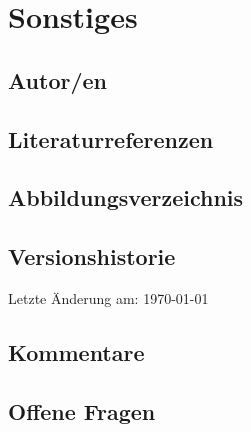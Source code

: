
\section*{Sonstiges}

\subsection*{Autor/en}
\authors

\subsection*{Literaturreferenzen}
\literature

\subsection*{Abbildungsverzeichnis}
\figures

\subsection*{Versionshistorie}
Letzte Änderung am: {\today} \\
\versionhistory

\subsection*{Kommentare}
\comments

\subsection*{Offene Fragen}
\questions


